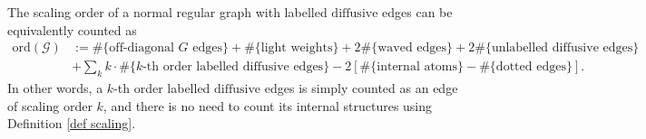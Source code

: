\documentclass{article}
\newcommand{\1}{\mathds{1}}
\numberwithin{equation}{section}
\renewcommand{\cal}{\mathcal}
\renewcommand{\leq}{\leqslant}
\renewcommand{\le}{\leq}
\newcommand{\Z}{\mathbb{Z}}
\newcommand{\dashed}{\text{diffusive}}
\newcommand{\self}{\text{self-energy}}
\DeclareMathOperator{\OO}{O}
\theoremstyle{plain} %
\theoremstyle{remark}
\newcommand{\Sele}{{\mathcal E}}
\newcommand{\Cele}{{\mathscr E}}
\begin{document}
The scaling order of a normal regular graph with labelled $\dashed$ edges can be equivalently counted as
\begin{align}
  \text{ord}(\cal G) &:= \#\{\text{off-diagonal }  G  \text{ edges}\} + \#\{\text{light weights}\} + 2\#\{ \text{waved edges}\}  + 2 \#\{\text{unlabelled $\dashed$ edges}\} \nonumber\\
&+\sum_k k\cdot   \#\{k\text{-th order labelled $\dashed$ edges}\}  -  2\left[ \#\{\text{internal atoms}\}- \#\{\text{dotted edges}\} \right] . \label{eq_deforderrandom3}
\end{align}
In other words, a $k$-th order labelled $\dashed$ edges is simply counted as an edge of scaling order $k$, and there is no need to count its internal structures using Definition \ref{def scaling}.





 
%
% 
%
 
\end{document}
